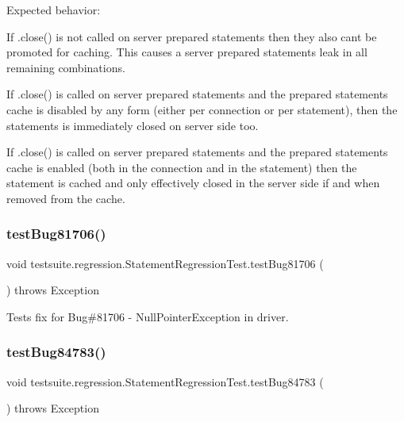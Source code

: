 Expected behavior\+:
\begin{DoxyItemize}
\item If .close() is not called on server prepared statements then they also can\textquotesingle{}t be promoted for caching. This causes a server prepared statements leak in all remaining combinations.
\item If .close() is called on server prepared statements and the prepared statements cache is disabled by any form (either per connection or per statement), then the statements is immediately closed on server side too.
\item If .close() is called on server prepared statements and the prepared statements cache is enabled (both in the connection and in the statement) then the statement is cached and only effectively closed in the server side if and when removed from the cache. 
\end{DoxyItemize}\mbox{\label{classtestsuite_1_1regression_1_1_statement_regression_test_aa0b8a4caabb1d1ebc0338bcffacce81d}} 
\subsubsection{\texorpdfstring{test\+Bug81706()}{testBug81706()}}
{\footnotesize\ttfamily void testsuite.\+regression.\+Statement\+Regression\+Test.\+test\+Bug81706 (\begin{DoxyParamCaption}{ }\end{DoxyParamCaption}) throws Exception}

Tests fix for Bug\#81706 -\/ Null\+Pointer\+Exception in driver. \mbox{\label{classtestsuite_1_1regression_1_1_statement_regression_test_a6a4bd5b7999d75792d30bdeb1b17b5af}} 
\subsubsection{\texorpdfstring{test\+Bug84783()}{testBug84783()}}
{\footnotesize\ttfamily void testsuite.\+regression.\+Statement\+Regression\+Test.\+test\+Bug84783 (\begin{DoxyParamCaption}{ }\end{DoxyParamCaption}) throws Exception}

